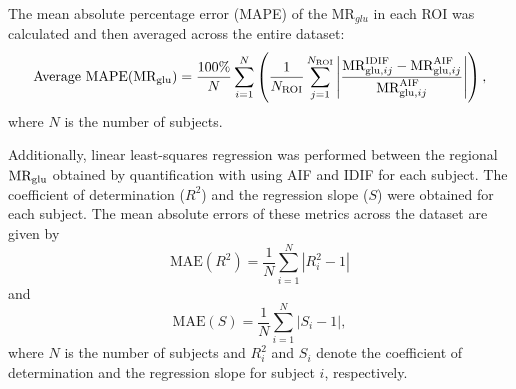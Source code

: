
The mean absolute percentage error (MAPE) of the \(\textrm{MR}_{glu}\) in each ROI was calculated and then averaged across the entire dataset:
\begin{equation}
	\text{Average MAPE}(\text{MR}_{\text{glu}})= \frac{100\%}{N} \sum_{i=1}^{N} \left( \frac{1}{N_{\text{ROI}}} \sum_{j=1}^{N_{\text{ROI}}} \left| \frac{\textrm{MR}_{\textrm{glu},ij}^{\textrm{IDIF}} - \textrm{MR}_{\textrm{glu},ij}^{\textrm{AIF}}}{\textrm{MR}_{\textrm{glu},ij}^{\textrm{AIF}}} \right| \right),
\end{equation}
where $N$ is the number of subjects.

Additionally, linear least-squares regression was performed between the regional \(\text{MR}_{\text{glu}}\) obtained by quantification with using AIF and IDIF for each subject. The coefficient of determination (\(R^2\)) and the regression slope (\(S\)) were obtained for each subject. The mean absolute errors of these metrics across the dataset are given by
\begin{equation}
	\text{MAE}(R^2) = \frac{1}{N} \sum_{i=1}^{N} \left| R^2_i - 1 \right|
\end{equation}
and
\begin{equation}
	\text{MAE}(S) = \frac{1}{N} \sum_{i=1}^{N} \left| S_i - 1 \right|,
\end{equation}
where $N$ is the number of subjects and \(R^2_i\) and \(S_i\) denote the coefficient of determination and the regression slope for subject \(i\), respectively.

%
%
%

